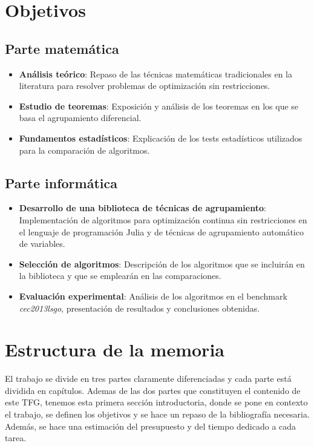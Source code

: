 \section*{Objetivos}

\subsection*{Parte matemática}
\begin{itemize}
    \item \textbf{Análisis teórico}: Repaso de las técnicas matemáticas tradicionales en la literatura para resolver problemas de optimización sin restricciones.
    \item \textbf{Estudio de teoremas}: Exposición y análisis de los teoremas en los que se basa el agrupamiento diferencial.
    \item \textbf{Fundamentos estadísticos}: Explicación de los tests estadísticos utilizados para la comparación de algoritmos.
\end{itemize}

\subsection*{Parte informática}
\begin{itemize}
    \item \textbf{Desarrollo de una biblioteca de técnicas de agrupamiento}: Implementación de algoritmos para optimización continua sin restricciones en el lenguaje de programación Julia y de técnicas de agrupamiento automático de variables.
    \item \textbf{Selección de algoritmos}: Descripción de los algoritmos que se incluirán en la biblioteca y que se emplearán en las comparaciones.
    \item \textbf{Evaluación experimental}: Análisis de los algoritmos en el benchmark \textit{cec2013lsgo}, presentación de resultados y conclusiones obtenidas.
\end{itemize}

\section*{Estructura de la memoria}

El trabajo se divide en tres partes claramente diferenciadas y cada parte está dividida en capítulos. Ademas de las dos partes que constituyen el contenido de este TFG, tenemos esta primera sección introductoria, donde se pone en contexto el trabajo, se definen los objetivos y se hace un repaso de la bibliografía necesaria. 
Además, se hace una estimación del presupuesto y del tiempo dedicado a cada tarea.

